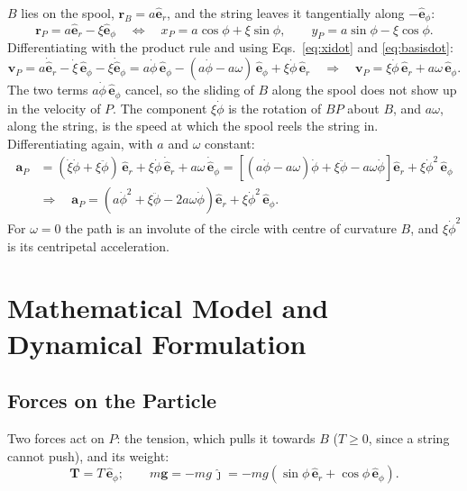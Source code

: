\documentclass[11pt,a4paper]{article}
\numberwithin{equation}{section}
\newcommand{\er}{\hat{\mathbf{e}}_r}
\newcommand{\ephi}{\hat{\mathbf{e}}_\phi}
\newcommand{\jj}{\hat{\boldsymbol{\jmath}}}
\newcommand{\vect}[1]{\mathbf{#1}}
\begin{document}
$B$ lies on the spool, $\vect r_B=a\er$, and the string leaves it tangentially along $-\ephi$:
\begin{equation}
  \vect r_P = a\er - \xi\ephi
  \quad\Longleftrightarrow\quad
  x_P = a\cos\phi + \xi\sin\phi,\qquad y_P = a\sin\phi - \xi\cos\phi. \label{eq:pos}
\end{equation}
Differentiating with the product rule and using Eqs.~\eqref{eq:xidot} and \eqref{eq:basisdot}:
\begin{equation}
  \vect v_P = a\dot{\hat{\mathbf e}}_r - \dot\xi\,\ephi - \xi\dot{\hat{\mathbf e}}_\phi
  = a\dot\phi\,\ephi - (a\dot\phi-a\omega)\,\ephi + \xi\dot\phi\,\er
  \quad\Longrightarrow\quad
  \boxed{\vect v_P = \xi\dot\phi\,\er + a\omega\,\ephi}. \label{eq:vel}
\end{equation}
The two terms $a\dot\phi\,\ephi$ cancel, so the sliding of $B$ along the spool does not show up in the velocity of $P$. The component $\xi\dot\phi$ is the rotation of $BP$ about $B$, and $a\omega$, along the string, is the speed at which the spool reels the string in. Differentiating again, with $a$ and $\omega$ constant:
\begin{align}
  \vect a_P &= (\dot\xi\dot\phi + \xi\ddot\phi)\,\er + \xi\dot\phi\,\dot{\hat{\mathbf e}}_r + a\omega\,\dot{\hat{\mathbf e}}_\phi
  = \left[(a\dot\phi - a\omega)\dot\phi + \xi\ddot\phi - a\omega\dot\phi\right]\er + \xi\dot\phi^2\,\ephi \nonumber\\
  &\Longrightarrow\quad
  \boxed{\vect a_P = \left(a\dot\phi^2 + \xi\ddot\phi - 2a\omega\dot\phi\right)\er + \xi\dot\phi^2\,\ephi}. \label{eq:acc}
\end{align}
For $\omega=0$ the path is an involute of the circle with centre of curvature $B$, and $\xi\dot\phi^2$ is its centripetal acceleration.

\section{Mathematical Model and Dynamical Formulation}

\subsection{Forces on the Particle}

Two forces act on $P$: the tension, which pulls it towards $B$ ($T\geq0$, since a string cannot push), and its weight:
\begin{equation}
  \vect T = T\,\ephi;\qquad
  m\vect g = -mg\,\jj = -mg\left(\sin\phi\,\er + \cos\phi\,\ephi\right). \label{eq:forces}
\end{equation}
\end{document}
